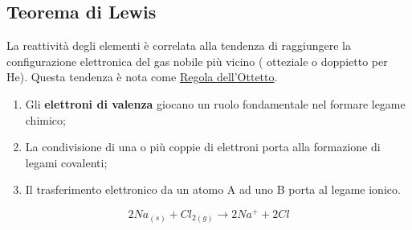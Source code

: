 \documentclass{book}
\begin{document}
\subsection{Teorema di Lewis}
La reattività degli elementi è correlata alla tendenza di raggiungere la
configurazione elettronica del gas nobile più vicino ({\color{red} otteziale} o
doppietto per He). Questa tendenza è nota come \underline{Regola dell'Ottetto}.
\begin{enumerate}
	\item Gli \textbf{elettroni di valenza} giocano un ruolo fondamentale nel
		formare legame chimico;
	\item La condivisione di una o più coppie di elettroni porta alla
		formazione di legami covalenti;
	\item Il trasferimento elettronico da un atomo {\color{red}A} ad uno
		{\color{blue}B} porta al legame ionico.
\end{enumerate}
\begin{equation}
	2Na_{(s)}+Cl_{2(g)}\to 2Na^++2Cl
\end{equation}


\printindex
\end{document}
